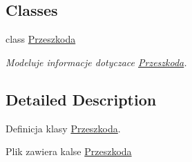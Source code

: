 \subsection*{Classes}
\begin{DoxyCompactItemize}
\item 
class \hyperlink{class_przeszkoda}{Przeszkoda}
\begin{DoxyCompactList}\small\item\em Modeluje informacje dotyczace \hyperlink{class_przeszkoda}{Przeszkoda}. \end{DoxyCompactList}\end{DoxyCompactItemize}


\subsection{Detailed Description}
Definicja klasy \hyperlink{class_przeszkoda}{Przeszkoda}. 

Plik zawiera kalse \hyperlink{class_przeszkoda}{Przeszkoda} 